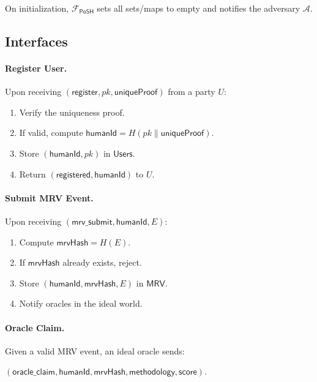 \documentclass[11pt,a4paper]{report}
\theoremstyle{definition}
\theoremstyle{remark}
\begin{document}
On initialization, $\mathcal{F}_{\textsf{PoSH}}$ sets all sets/maps to empty
and notifies the adversary $\mathcal{A}$.

\subsection*{Interfaces}

\paragraph{Register User.}

Upon receiving $(\textsf{register}, pk, \mathsf{uniqueProof})$ from a party $U$:

\begin{enumerate}[leftmargin=*]
  \item Verify the uniqueness proof.
  \item If valid, compute $\mathsf{humanId} = H(pk \parallel \mathsf{uniqueProof})$.
  \item Store $(\mathsf{humanId}, pk)$ in $\mathsf{Users}$.
  \item Return $(\textsf{registered}, \mathsf{humanId})$ to $U$.
\end{enumerate}

\paragraph{Submit MRV Event.}

Upon receiving $(\textsf{mrv\_submit}, \mathsf{humanId}, E)$:

\begin{enumerate}[leftmargin=*]
  \item Compute $\mathsf{mrvHash} = H(E)$.
  \item If $\mathsf{mrvHash}$ already exists, reject.
  \item Store $(\mathsf{humanId}, \mathsf{mrvHash}, E)$ in $\mathsf{MRV}$.
  \item Notify oracles in the ideal world.
\end{enumerate}

\paragraph{Oracle Claim.}

Given a valid MRV event, an ideal oracle sends:

$(\textsf{oracle\_claim}, \mathsf{humanId}, \mathsf{mrvHash}, \mathsf{methodology}, \mathsf{score})$.
\end{document}
